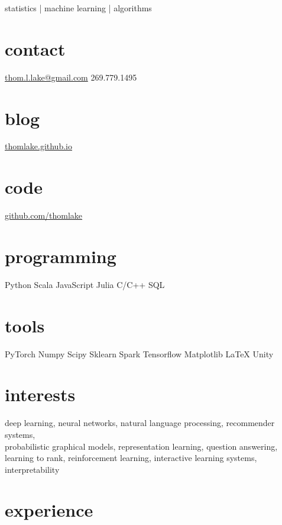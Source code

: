 \documentclass[print]{friggeri-cv}
\begin{document}
       {statistics | machine learning | algorithms}

\begin{aside}
  \section{contact}
    \href{mailto:thom.l.lake@gmail.com}{thom.l.lake@gmail.com}
    269.779.1495
  \section{blog}
    \href{https://thomlake.github.io/}{thomlake.github.io}
  \section{code}
    \href{https://github.com/thomlake}{github.com/thomlake}
  \section{programming}
    Python
    Scala
    JavaScript
    Julia
    C/C++
    SQL
  \section{tools}
    PyTorch
    Numpy
    Scipy
    Sklearn
    Spark
    Tensorflow    
    Matplotlib
    \LaTeX
    Unity
\end{aside}

\section{interests}


deep learning, neural networks, natural language processing, recommender systems,\\ probabilistic graphical models, representation learning, question answering, learning to rank, reinforcement learning, interactive learning systems, interpretability

\section{experience}
\end{document}
